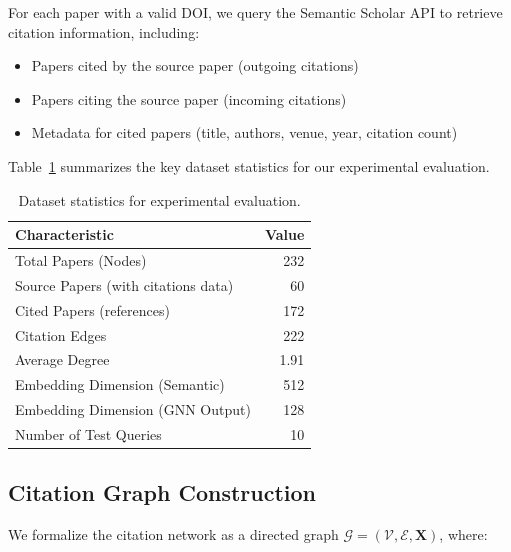 \documentclass[pdflatex,sn-mathphys-num]{sn-jnl}
\theoremstyle{thmstyleone}%
\theoremstyle{thmstyletwo}%
\theoremstyle{thmstylethree}%
\begin{document}
For each paper with a valid DOI, we query the Semantic Scholar API to retrieve citation information, including:

\begin{itemize}
    \item Papers cited by the source paper (outgoing citations)
    \item Papers citing the source paper (incoming citations)
    \item Metadata for cited papers (title, authors, venue, year, citation count)
\end{itemize}

Table~\ref{tab:dataset} summarizes the key dataset statistics for our experimental evaluation.

\begin{table}[t]
\centering
\caption{Dataset statistics for experimental evaluation.}
\label{tab:dataset}
\begin{tabular}{lr}
\toprule
\textbf{Characteristic} & \textbf{Value} \\
\midrule
Total Papers (Nodes) & 232 \\
\quad Source Papers (with citations data) & 60 \\
\quad Cited Papers (references) & 172 \\
Citation Edges & 222 \\
Average Degree & 1.91 \\
Embedding Dimension (Semantic) & 512 \\
Embedding Dimension (GNN Output) & 128 \\
Number of Test Queries & 10 \\
\bottomrule
\end{tabular}
\end{table}

\subsection{Citation Graph Construction}

%     

We formalize the citation network as a directed graph $\mathcal{G} = (\mathcal{V}, \mathcal{E}, \mathbf{X})$, where:
\end{document}
